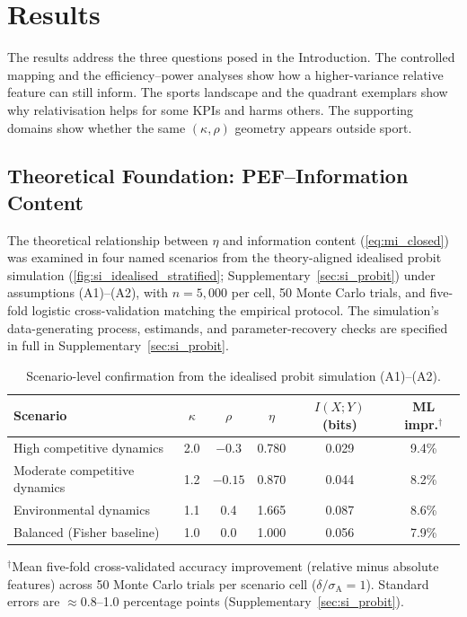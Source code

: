\section{Results}
\label{sec:results}

The results address the three questions posed in the Introduction. The controlled mapping and the efficiency--power analyses show how a higher-variance relative feature can still inform. The sports landscape and the quadrant exemplars show why relativisation helps for some KPIs and harms others. The supporting domains show whether the same $(\kappa,\rho)$ geometry appears outside sport.

\subsection{Theoretical Foundation: PEF--Information Content}

The theoretical relationship between $\eta$ and information content (\cref{eq:mi_closed}) was examined in four named scenarios from the theory-aligned idealised probit simulation (\cref{fig:si_idealised_stratified}; Supplementary~\cref{sec:si_probit}) under assumptions (A1)--(A2), with $n=5{,}000$ per cell, 50 Monte Carlo trials, and five-fold logistic cross-validation matching the empirical protocol. The simulation's data-generating process, estimands, and parameter-recovery checks are specified in full in Supplementary~\cref{sec:si_probit}.

\begin{table}[t]
  \centering
  \caption{Scenario-level confirmation from the idealised probit simulation (A1)--(A2).}
  \label{tab:scenarios}
  \begin{tabular}{@{}lccccc@{}}
    \toprule
    \textbf{Scenario} & $\kappa$ & $\rho$ & $\eta$ & $I(X;Y)$ (bits) & ML impr.$^{\dagger}$ \\
    \midrule
    High competitive dynamics      & 2.0  & $-0.3$  & 0.780 & 0.029 & 9.4\% \\
    Moderate competitive dynamics  & 1.2  & $-0.15$ & 0.870 & 0.044 & 8.2\% \\
    Environmental dynamics         & 1.1  & 0.4     & 1.665 & 0.087 & 8.6\% \\
    Balanced (Fisher baseline)     & 1.0  & 0.0     & 1.000 & 0.056 & 7.9\% \\
    \bottomrule
  \end{tabular}

  \medskip
  \begin{minipage}{0.95\linewidth}\small
    $^{\dagger}$Mean five-fold cross-validated accuracy improvement (relative minus absolute features) across 50 Monte Carlo trials per scenario cell ($\delta/\sigma_{\mathrm{A}}=1$). Standard errors are $\approx$0.8--1.0 percentage points (Supplementary~\cref{sec:si_probit}).
  \end{minipage}
\end{table}


